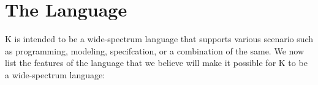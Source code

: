 \documentclass{llncs}
\newcommand{\lang}{K}
\begin{document}
\section{The Language}

\begin{comment}
We would consider the current K language (textual version of SysML) as
our starting point, or we simply consider the K language as the
language, and as a group collectively focus on supporting the Europa
project, the latter probably being more practical.  The Europa project
wants this language, they claim they rely on it to {\em ``clean up the
  SysML mess''}.  There is a certain pressure to get this right.
\end{comment}

\lang{} is intended to be a wide-spectrum language that supports
various scenario such as programming, modeling, specifcation, or a
combination of the same. We now list the features of the language that
we believe will make it possible for \lang{} to be a wide-spectrum
language:

\begin{comment}
The language should be one that each of us would want to program our
systems in. Hence it should be as fast as C when staying in the low
level fragment.  We would discuss which fundamental paradigm the
language should built on: object-oriented? functional?,
logic-programming?, data-base technology? (currently K has relations,
which resemble relational databases). We would discuss whether it will
make sense to let the language allow abstract specification as well as
low-level C-like programming. Is it possible to merge these concepts?
Ocaml is claimed to be as fast as C and combines the two
levels. Garbage collection could get in the way.
\end{comment}
\end{document}

